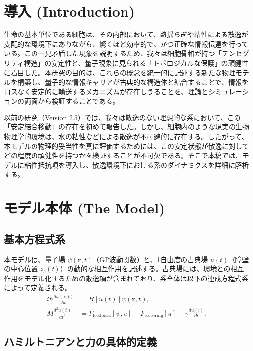 \documentclass[a4paper,11pt,ja=standard]{bxjsarticle}
\begin{document}
\FloatBarrier
\section{導入 (Introduction)}
生命の基本単位である細胞は、その内部において、熱揺らぎや粘性による散逸が支配的な環境下にありながら、驚くほど効率的で、かつ正確な情報伝達を行っている。この一見矛盾した現象を説明するため、我々は細胞骨格が持つ「テンセグリティ構造」の安定性と、量子現象に見られる「トポロジカルな保護」の頑健性に着目した。本研究の目的は、これらの概念を統一的に記述する新たな物理モデルを構築し、量子的な情報キャリアが古典的な構造体と結合することで、情報をロスなく安定的に輸送するメカニズムが存在しうることを、理論とシミュレーションの両面から検証することである。

以前の研究（Version 2.5）では、我々は散逸のない理想的な系において、この「安定結合移動」の存在を初めて報告した。しかし、細胞内のような現実の生物物理学的環境は、水の粘性などによる散逸が不可避的に存在する。したがって、本モデルの物理的妥当性を真に評価するためには、この安定状態が散逸に対してどの程度の頑健性を持つかを検証することが不可欠である。そこで本稿では、モデルに粘性抵抗項を導入し、散逸環境下における系のダイナミクスを詳細に解析する。
\FloatBarrier
\section{モデル本体 (The Model)}
\subsection{基本方程式系}
本モデルは、量子場 $\psi(\mathbf{r},t)$（GP波動関数）と、1自由度の古典場 $u(t)$（障壁の中心位置 $z_b(t)$）の動的な相互作用を記述する。古典場には、環境との相互作用をモデル化するための散逸項が含まれており、系全体は以下の連成方程式系によって定義される。
\begin{align}
 i\hbar\frac{\partial\psi(\mathbf r,t)}{\partial t}&=H[u(t)]\psi(\mathbf r,t), \label{eq:schrodinger} \\
  M\frac{d^{2}u(t)}{dt^{2}}&=F_{\text{feedback}}[\psi,u]+F_{\text{restoring}}[u] - \gamma \frac{du(t)}{dt}. \label{eq:newton_diss}
\end{align}

\subsection{ハミルトニアンと力の具体的定義}
\end{document}
